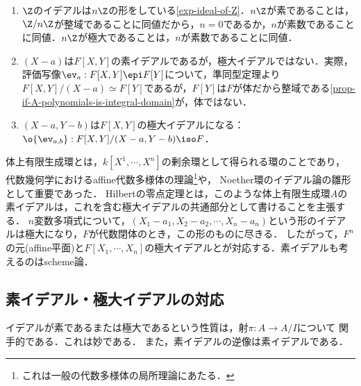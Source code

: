 \documentclass[uplatex,dvipdfmx]{jsreport}
\begin{document}
\begin{example}[素イデアルと極大イデアル]\mbox{}\label{exp-prime-ideals-of-Z}
    \begin{enumerate}
        \item $\Z$のイデアルは$n\Z$の形をしている\ref{exp-ideal-of-Z}．$n\Z$が素であることは，$\Z/n\Z$が整域であることに同値だから，$n=0$であるか，$n$が素数であることに同値．$n\Z$が極大であることは，$n$が素数であることに同値．
        \item $(X-a)$は$F[X,Y]$の素イデアルであるが，極大イデアルではない．実際，評価写像$\ev_a:F[X,Y]\epi F[Y]$について，準同型定理より$F[X,Y]/(X-a)\simeq F[Y]$であるが，$F[Y]$は$F$が体だから整域である\ref{prop-if-A-polynomials-is-integral-domain}が，体ではない．
        \item $(X-a,Y-b)$は$F[X,Y]$の極大イデアルになる：$\o{\ev_{a,b}}:F[X,Y]/(X-a,Y-b)\iso F$．
    \end{enumerate}
\end{example}
\begin{remark}[体上有限生成環の理論]
    体上有限生成環とは，$k[X^1,\cdots,X^n]$の剰余環として得られる環のことであり，
    代数幾何学におけるaffine代数多様体の理論\footnote{これは一般の代数多様体の局所理論にあたる．}や，
    Noether環のイデアル論の雛形として重要であった．
    Hilbertの零点定理とは，このような体上有限生成環$A$の素イデアルは，これを含む極大イデアルの共通部分として書けることを主張する．
    $n$変数多項式について，$(X_1-a_1,X_2-a_2,\cdots,X_n-a_n)$という形のイデアルは極大になり，$F$が代数閉体のとき，この形のものに尽きる．
    したがって，$F^n$の元(affine平面)と$F[X_1,\cdots,X_n]$の極大イデアルとが対応する．素イデアルも考えるのはscheme論．
\end{remark}

\subsection{素イデアル・極大イデアルの対応}

\begin{tcolorbox}[colframe=ForestGreen, colback=ForestGreen!10!white,breakable,colbacktitle=ForestGreen!40!white,coltitle=black,fonttitle=\bfseries\sffamily,
title=]
    イデアルが素であるまたは極大であるという性質は，射$\pi:A\to A/I$について
    関手的である．これは妙である．
    また，素イデアルの逆像は素イデアルである．
\end{tcolorbox}
\end{document}
